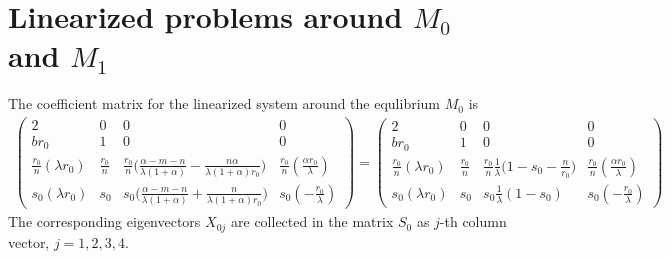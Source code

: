 \documentclass[a4paper,11pt]{article}
\theoremstyle{remark}
\begin{document}
\section{Linearized problems around $M_0$ and $M_1$}\label{append:lin}
The coefficient matrix for the linearized system around the equlibrium $M_0$ is
\begin{align*}
 \begin{pmatrix}
          2 & 0 & 0 & 0 \\
          br_0 & 1 & 0 & 0\\
          \frac{r_0}{n}(\lambda r_0) & \frac{r_0}{n} & \frac{r_0}{n}\Big(\frac{\alpha-m-n}{\lambda(1+\alpha)} - \frac{n\alpha}{\lambda(1+\alpha)r_0}\Big) & \frac{r_0}{n}(\frac{\alpha r_0}{\lambda})\\
          s_0(\lambda r_0) & s_0 & s_0\Big(\frac{\alpha-m-n}{\lambda(1+\alpha)} + \frac{n}{\lambda(1+\alpha)r_0}\Big) & s_0(-\frac{r_0}{\lambda})
         \end{pmatrix}
        =\begin{pmatrix}
          2 & 0 & 0 & 0 \\
          br_0 & 1 & 0 & 0\\
          \frac{r_0}{n}(\lambda r_0) & \frac{r_0}{n} & \frac{r_0}{n}\frac{1}{\lambda}\Big(1-s_0-\frac{n}{r_0}\Big) & \frac{r_0}{n}(\frac{\alpha r_0}{\lambda})\\
          s_0(\lambda r_0) & s_0 & s_0\frac{1}{\lambda}(1-s_0) & s_0(-\frac{r_0}{\lambda})
         \end{pmatrix}
\end{align*}
The corresponding eigenvectors $X_{0j}$ are collected in the matrix $S_0$ as $j$-th column vector, $j=1,2,3,4$.
\end{document}

